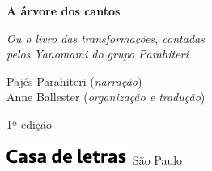 




\begingroup\thispagestyle{empty}\vspace*{.05\textheight} 

              {\formular
              \huge
              \noindent
              \textbf{A árvore dos cantos}\\
              
              \vspace{-0.5cm}
              
              }

              \vspace{0.5cm}

              \noindent{}\textit{Ou o livro das transformações, contadas\\pelos Yanomami do  grupo Parahiteri}

              \vspace{1cm}

              \vfill              

              {\small
              \noindent{}Pajés Parahiteri (\textit{narração}) \vspace{0.2cm}\\
              \noindent{}Anne Ballester (\textit{organização e tradução})
              }

              \vspace{0.5cm}

              {\small\noindent{}1ª edição}

              \vfill\noindent\includegraphics[width=0.3\textwidth]{LOGO_CDL.png}
              \break{} 
              \smallskip
              {\fontsize{30}{40}%
              \scriptsize\noindent São Paulo\quad\the\year}

\endgroup
\pagebreak
